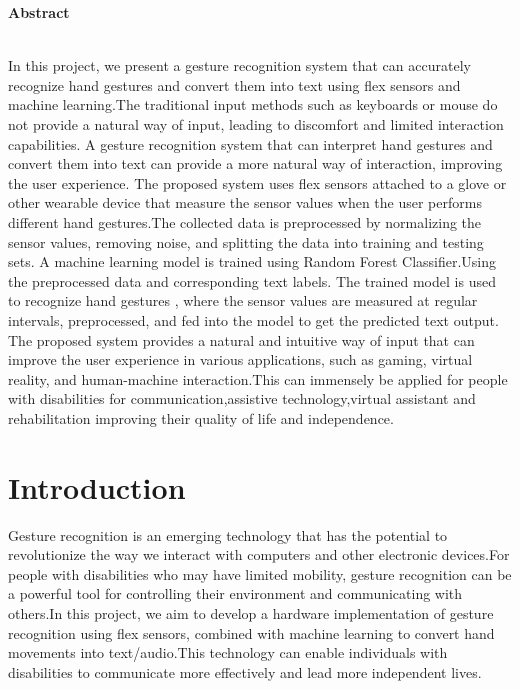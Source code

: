 \documentclass[a4paper,12pt,oneside]{report}
\begin{document}
 \vspace*{1.6cm}
 \begin{center} {\Large \bf Abstract}\end{center}
 \noindent
 \\
In this project, we present a gesture recognition system that can accurately recognize hand
gestures and convert them into text using flex sensors and machine learning.The traditional input methods such as keyboards or mouse do not provide a natural way of
input, leading to discomfort and limited interaction capabilities. A gesture recognition system
that can interpret hand gestures and convert them into text can provide a more natural way
of interaction, improving the user experience. The proposed system uses flex sensors
attached to a glove or other wearable device that measure the sensor values when the user
performs different hand gestures.The collected data is preprocessed by normalizing the
sensor values, removing noise, and splitting the data into training and testing sets. A
machine learning model is trained using Random Forest Classifier.Using the preprocessed data and corresponding text labels. The trained model is
used to recognize hand gestures , where the sensor values are measured at
regular intervals, preprocessed, and fed into the model to get the predicted text output. The
proposed system provides a natural and intuitive way of input that can improve the user
experience in various applications, such as gaming, virtual reality, and human-machine
interaction.This can immensely be applied for people with disabilities for communication,assistive
technology,virtual assistant and rehabilitation improving their quality of life and independence.

	
	
	
	
	

 
\chapter{Introduction}
 \label{chap:intro}
 \par
 Gesture recognition is an emerging technology that has the potential to revolutionize the way we interact with computers and other electronic devices.For people with disabilities who may have limited mobility, gesture recognition can be a powerful tool for controlling their environment and communicating with others.In this project, we aim to develop a hardware implementation of gesture recognition using flex sensors, combined with machine learning  to convert hand movements into text/audio.This technology can enable individuals with disabilities to communicate more effectively and lead more independent lives.
\end{document}
